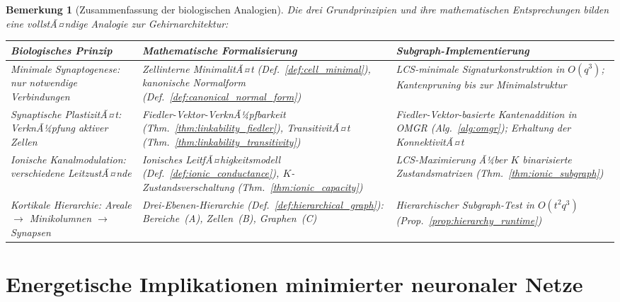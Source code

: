 ﻿\documentclass[12pt, a4paper, openany]{report}
\newtheorem{remark}[theorem]{Bemerkung}
\begin{document}
\begin{remark}[Zusammenfassung der biologischen Analogien]
\label{rem:bio_summary}
Die drei Grundprinzipien und ihre mathematischen Entsprechungen bilden
eine vollstÃ¤ndige Analogie zur Gehirnarchitektur:

\begin{center}
\renewcommand{\arraystretch}{1.4}
\begin{tabular}{p{3.2cm}|p{4.5cm}|p{5.2cm}}
\hline
\textbf{Biologisches Prinzip} & \textbf{Mathematische Formalisierung} & \textbf{Subgraph-Implementierung} \\
\hline
Minimale Synaptogenese: nur notwendige Verbindungen & Zellinterne MinimalitÃ¤t (Def.~\ref{def:cell_minimal}), kanonische Normalform (Def.~\ref{def:canonical_normal_form}) & LCS-minimale Signaturkonstruktion in $O(q^3)$; Kantenpruning bis zur Minimalstruktur \\
\hline
Synaptische PlastizitÃ¤t: VerknÃ¼pfung aktiver Zellen & Fiedler-Vektor-VerknÃ¼pfbarkeit (Thm.~\ref{thm:linkability_fiedler}), TransitivitÃ¤t (Thm.~\ref{thm:linkability_transitivity}) & Fiedler-Vektor-basierte Kantenaddition in OMGR (Alg.~\ref{alg:omgr}); Erhaltung der KonnektivitÃ¤t \\
\hline
Ionische Kanalmodulation: verschiedene LeitzustÃ¤nde& Ionisches LeitfÃ¤higkeitsmodell (Def.~\ref{def:ionic_conductance}), $K$-Zustandsverschaltung (Thm.~\ref{thm:ionic_capacity}) & LCS-Maximierung Ã¼ber $K$ binarisierte Zustandsmatrizen (Thm.~\ref{thm:ionic_subgraph}) \\
\hline
Kortikale Hierarchie: Areale $\to$ Minikolumnen $\to$ Synapsen & Drei-Ebenen-Hierarchie (Def.~\ref{def:hierarchical_graph}): Bereiche~(A), Zellen~(B), Graphen~(C) & Hierarchischer Subgraph-Test in $O(t^2 q^3)$ (Prop.~\ref{prop:hierarchy_runtime}) \\
\hline
\end{tabular}
\end{center}
\end{remark}

\chapter{Energetische Implikationen minimierter neuronaler Netze}
\label{chap:energy}
\end{document}
